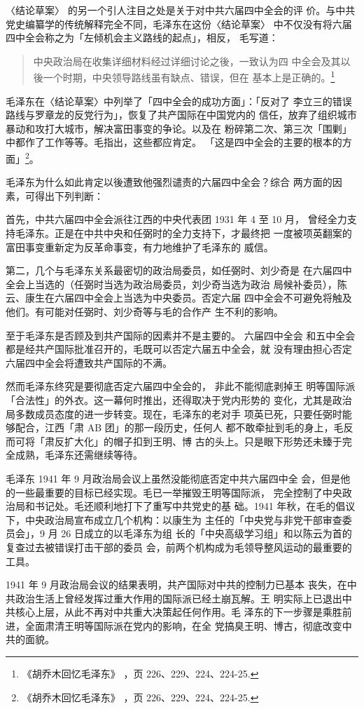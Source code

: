 〈结论草案〉
的另一个引人注目之处是关于对中共六届四中全会的评
价。与中共党史编纂学的传统解释完全不同，毛泽东在这份〈结论草案〉
中不仅没有将六届四中全会称之为「左倾机会主义路线的起点」，相反，
毛写道：
\begin{quote}
{\fzwkai 中央政治局在收集详细材料经过详细讨论之後，一致认为四
中全会及其以後一个时期，中央领导路线虽有缺点、错误，但在
基本上是正确的。\footnote{《胡乔木回忆毛泽东》
，页 226、229、224、224-25.}}
\end{quote}
毛泽东在〈结论草案〉中列举了「四中全会的成功方面」：「反对了
李立三的错误路线与罗章龙的反党行为」，恢复了共产国际在中国党内的
信任，放弃了组织城市暴动和攻打大城市，解决富田事变的争论。以及在
粉碎第二次、第三次「围剿」中都作了工作等等。毛指出，这些都应肯定。
「这是四中全会的主要的根本的方面」\footnote{《胡乔木回忆毛泽东》
，页 226、229、224、224-25.}。

毛泽东为什么如此肯定以後遭致他强烈谴责的六届四中全会？综合
两方面的因素，可得出下列判断：

首先，中共六届四中全会派往江西的中央代表团 1931 年 4 至 10 月，
曾经全力支持毛泽东。正是在中共中央和任弼时的全力支持下，才最终把
一度被项英翻案的富田事变重新定为反革命事变，有力地维护了毛泽东的
威信。

第二，几个与毛泽东关系最密切的政治局委员，如任弼时、刘少奇是
在六届四中全会上当选的（任弼时当选为政治局委员，刘少奇当选为政治
局候补委员），陈云、康生在六届四中全会上当选为中央委员。否定六届
四中全会不可避免将触及他们。有可能对任弼时、刘少奇等与毛的合作产
生不利的影响。

至于毛泽东是否顾及到共产国际的因素并不是主要的。
六届四中全会
和五中全会都是经共产国际批准召开的，毛既可以否定六届五中全会，就
没有理由担心否定六届四中全会将遭致共产国际的不满。

然而毛泽东终究是要彻底否定六届四中全会的，
非此不能彻底剥掉王
明等国际派「合法性」的外衣。这一幕何时推出，还得取决于党内形势的
变化，尤其是政治局多数成员态度的进一步转变。现在，毛泽东的老对手
项英已死，只要任弼时能够配合，江西「肃 AB 团」的那一段历史，任何人
都不敢牵扯到毛的身上，毛反而可将「肃反扩大化」的帽子扣到王明、博
古的头上。只是眼下形势还未臻于完全成熟，毛泽东还需继续等待。

毛泽东 1941 年 9 月政治局会议上虽然没能彻底否定中共六届四中全
会，但是他的一些最重要的目标已经实现。毛已一举摧毁王明等国际派，
完全控制了中央政治局和书记处。毛还顺利地打下了重写中共党史的基
础。1941 年秋，在毛的倡议下，中央政治局宣布成立几个机构：以康生为
主任的「中央党与非党干部审查委员会」，9 月 26 日成立的以毛泽东为组
长的「中央高级学习组」和以陈云为首的复查过去被错误打击干部的委员
会，前两个机构成为毛领导整风运动的最重要的工具。

1941 年 9 月政治局会议的结果表明，共产国际对中共的控制力已基本
丧失，在中共政治生活上曾经发挥过重大作用的国际派已经土崩瓦解。王
明实际上已退出中共核心上层，从此不再对中共重大决策起任何作用。毛
泽东的下一步骤是乘胜前进，全面肃清王明等国际派在党内的影响，在全
党搞臭王明、博古，彻底改变中共的面貌。
